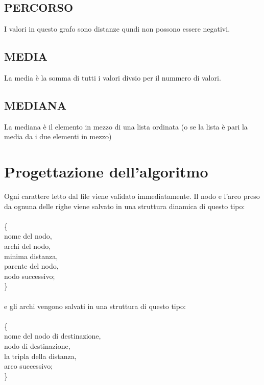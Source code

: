 \documentclass[11pt, a4paper, titlepage, block]{article}
\begin{document}
	\subsection{PERCORSO}
	I valori in questo grafo sono distanze qundi non possono essere negativi.
	\subsection{MEDIA}
	La media \`{e} la somma di tutti i valori divsio per il nummero di valori.
	\subsection{MEDIANA}
	La mediana \`{e} il elemento in mezzo di una lista ordinata (o se la lista \`{e} pari la media da i due elementi in mezzo)\\

	\newpage
\section{Progettazione dell'algoritmo}
	Ogni carattere letto dal file viene validato immediatamente. Il nodo e l'arco preso da ognuna delle righe viene salvato in una struttura dinamica di questo tipo: \\\\
	\{\\
	\indent nome del nodo,\\
	\indent archi del nodo,\\
	\indent minima distanza,\\
	\indent parente del nodo,\\
	\indent nodo successivo; \\
	\}\\\\
	e gli archi vengono salvati in una struttura di questo tipo:\\\\
	\{\\
	\indent nome del nodo di destinazione,\\
	\indent nodo di destinazione,\\
	\indent la tripla della distanza,\\
	\indent arco successivo;\\
	\}\\\\
\end{document}
